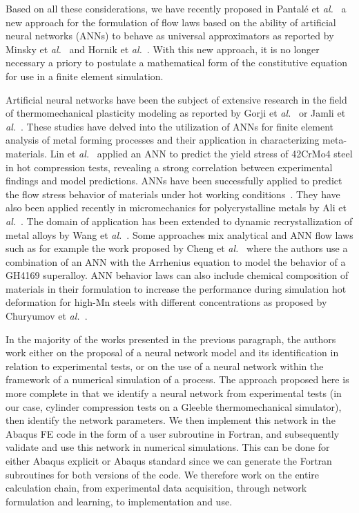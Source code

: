 \documentclass[algorithms,article,submit,pdftex,oneauthors]{Definitions/mdpi}
\makeatletter
\DeclareRobustCommand{\eal}{et \emph{al.}\@\xspace}
\makeatother
\begin{document}
Based on all these considerations, we have recently proposed in Pantalé \eal~\cite{Pantale-2021-EIN, Pantale-2023-DIA} a new approach for the formulation of flow laws based on the ability of artificial neural networks (ANNs) to behave as universal approximators as reported by Minsky \eal~\cite{Minsky-1969-PIC} and Hornik \eal~\cite{Hornik-1989-MFN}.
With this new approach, it is no longer necessary a priory to postulate a mathematical form of the constitutive equation for use in a finite element simulation.

Artificial neural networks have been the subject of extensive research in the field of thermomechanical plasticity modeling as reported by Gorji \eal~\cite{Gorji-2020} or Jamli \eal~\cite{Jamli-2019-SNN}.
These studies have delved into the utilization of ANNs for finite element analysis of metal forming processes and their application in characterizing meta-materials.
Lin \eal~\cite{Lin-2008} applied an ANN to predict the yield stress of 42CrMo4 steel in hot compression tests, revealing a strong correlation between experimental findings and model predictions.
ANNs have been successfully applied to predict the flow stress behavior of materials under hot working conditions~\cite{Stoffel-2018-ANN, Stoffel-2019-NNB}.
They have also been applied recently in micromechanics for polycrystalline metals by Ali \eal~\cite{Ali-2019-AAN}.
The domain of application has been extended to dynamic recrystallization of metal alloys by Wang \eal~\cite{Wang-2021-ANN}.
Some approaches mix analytical and ANN flow laws such as for example the work proposed by Cheng \eal~\cite{Cheng-2022-CWD} where the authors use a combination of an ANN with the Arrhenius equation to model the behavior of a GH4169 superalloy.
ANN behavior laws can also include chemical composition of materials in their formulation to increase the performance during simulation hot deformation for high-Mn steels with different concentrations as proposed by Churyumov \eal~\cite{Churyumov-2023-PTS}.

In the majority of the works presented in the previous paragraph, the authors work either on the proposal of a neural network model and its identification in relation to experimental tests, or on the use of a neural network within the framework of a numerical simulation of a process.
The approach proposed here is more complete in that we identify a neural network from experimental tests (in our case, cylinder compression tests on a Gleeble thermomechanical simulator), then identify the network parameters.
We then implement this network in the Abaqus FE code in the form of a user subroutine in Fortran, and subsequently validate and use this network in numerical simulations.
This can be done for either Abaqus explicit or Abaqus standard since we can generate the Fortran subroutines for both versions of the code.
We therefore work on the entire calculation chain, from experimental data acquisition, through network formulation and learning, to implementation and use.
\end{document}
